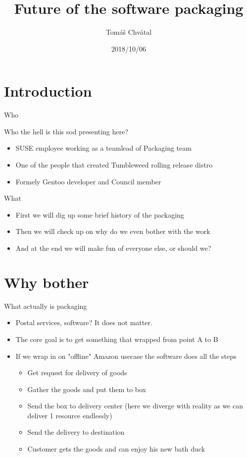 \documentclass{beamer}
\author{Tom\'{a}\v{s} Chv\'{a}tal\newline {\small tchvatal@suse.com}\newline {\small SUSE/L3 - Packaging}}
\title{Future of the software packaging}
\date{2018/10/06}
\begin{document}
\begin{frame}[t,plain]
\titlepage
\end{frame}

\section{Introduction}

\begin{frame}[t]{Who}
    \begin{center}Who the hell is this sod presenting here?\end{center}
	\begin{itemize}
	\item SUSE employee working as a teamlead of Packaging team
    \item One of the people that created Tumbleweed rolling release distro
    \item Formely Gentoo developer and Council member
	\end{itemize}
\end{frame}

\begin{frame}[t]{What}
	\begin{itemize}
	\item First we will dig up some brief history of the packaging
    \item Then we will check up on why do we even bother with the work
    \item And at the end we will make fun of everyone else, or should we?
	\end{itemize}
\end{frame}

\section{Why bother}

\begin{frame}[t]{What actually is packaging}
	\begin{itemize}
	\item Postal services, software? It does not matter.
	\item The core goal is to get something that wrapped from point A to B
	\item If we wrap in on "offline" Amazon usecase the software does all the steps
	\begin{itemize}
	\item Get request for delivery of goods
	\item Gather the goods and put them to box
	\item Send the box to delivery center (here we diverge with reality as we can deliver 1 resource endlessly)
	\item Send the delivery to destination
	\item Customer gets the goods and can enjoy his new bath duck
	\end{itemize}
	\end{itemize}
\end{frame}
\end{document}
